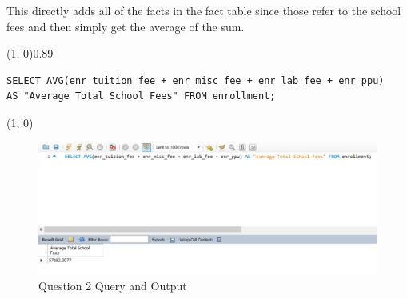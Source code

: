 
This directly adds all of the facts in the fact table since those refer to the school fees and then simply get the average of the sum.
\vspace{\baselineskip}

\sol{}
\noindent\line(1, 0){0.89\linewidth}
\begin{verbatim}
SELECT AVG(enr_tuition_fee + enr_misc_fee + enr_lab_fee + enr_ppu)
AS "Average Total School Fees" FROM enrollment;
\end{verbatim}
\noindent\line(1, 0){\linewidth}

\begin{figure}[H]
    \centering
    \includegraphics[width=0.7\linewidth]{images/q2.png}
    \caption{Question 2 Query and Output}
\end{figure}
